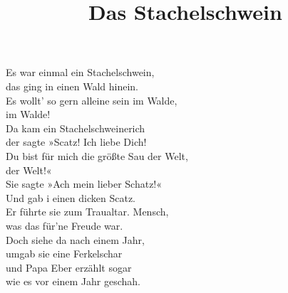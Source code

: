 \title{Das Stachelschwein} 

Es war einmal ein Stachelschwein, \\ 
das ging in einen Wald hinein. \\ 
Es wollt’ so gern alleine sein im Walde, \\ 
im Walde! \\ 
Da kam ein Stachelschweinerich \\ 
der sagte »Scatz! Ich liebe Dich! \\ 
Du bist für mich die größte Sau der Welt, \\ 
der Welt!« \\ 
Sie sagte »Ach mein lieber Schatz!« \\ 
Und gab i einen dicken Scatz. \\ 
Er führte sie zum Traualtar. Mensch, \\ 
was das für’ne Freude war. \\ 
Doch siehe da nach einem Jahr, \\ 
umgab sie eine Ferkelschar \\ 
und Papa Eber erzählt sogar \\ 
wie es vor einem Jahr geschah.


